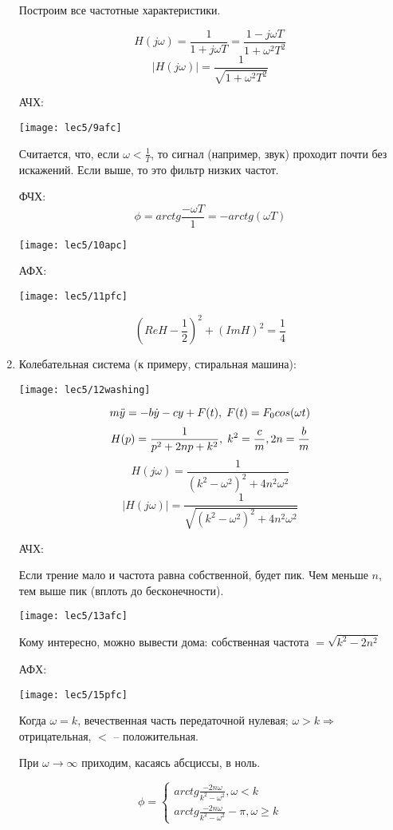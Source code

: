 \documentclass[main.tex]{subfiles}
\begin{document}
\begin{enumerate}[noitemsep]
	Построим все частотные характеристики.

	$$ H(j\omega) = \frac{1}{1 + j \omega T} = \frac{1 - j \omega T}{1 + \omega^2 T^2} $$
	$$ |H(j \omega)| = \frac{1}{\sqrt{1 + \omega^2 T^2}} $$

	АЧХ:

	\texttt{[image: lec5/9afc]}

	Считается, что, если $ \omega < \frac{1}{T} $, то сигнал (например, звук) проходит почти без искажений.
	Если выше, то это фильтр низких частот.

	ФЧХ:
	$$ \phi = arctg \frac{- \omega T}{1} = -arctg(\omega T) $$

	\texttt{[image: lec5/10apc]}

	АФХ:

	\texttt{[image: lec5/11pfc]}

	$$ (Re H - \frac{1}{2})^2 + (Im H)^2 = \frac{1}{4} $$

\item Колебательная система (к примеру, стиральная машина):

\texttt{[image: lec5/12washing]}

$$ m \ddot y = -b \dot y - c y + F(t), \thickspace F(t) = F_0 cos(\omega t) $$
$$ H(p) = \frac{1}{p^2 + 2np + k^2}, \thickspace k^2 = \frac{c}{m}, 2n = \frac{b}{m} $$
$$ H(j \omega) = \frac{1}{(k^2 - \omega^2)^2 + 4 n^2 \omega^2} $$
$$ |H(j \omega)| = \frac{1}{\sqrt{(k^2-\omega^2)^2 + 4 n^2 \omega^2}} $$

АЧХ:

Если трение мало и частота равна собственной, будет пик.
Чем меньше $ n $, тем выше пик (вплоть до бесконечности).

\texttt{[image: lec5/13afc]}

Кому интересно, можно вывести дома: собственная частота $ = \sqrt{k^2 - 2n^2} $

АФХ:

\texttt{[image: lec5/15pfc]}

Когда $ \omega = k $, вечественная часть передаточной нулевая; $ \omega > k \Rightarrow $ отрицательная, $ < $ -- положительная.

При $ \omega \to \infty $ приходим, касаясь абсциссы, в ноль.

$$ \phi = \begin{cases}
arctg \frac{- 2n \omega}{k^2 - \omega^2}, \omega < k \\
arctg \frac{- 2n \omega}{k^2 - \omega^2} - \pi, \omega \ge k
\end{cases} $$


\end{enumerate}
\end{document}
